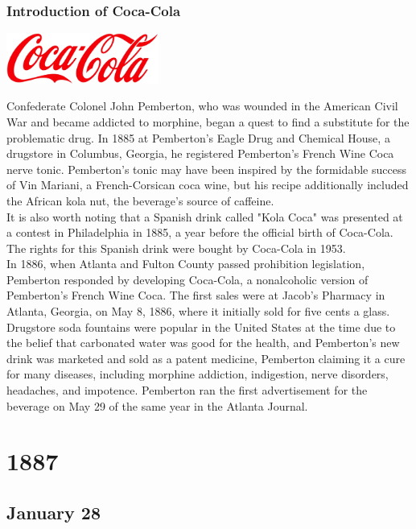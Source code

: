 \documentclass[11pt]{report}
\begin{document}
\subsection{Introduction of Coca-Cola}
\vspace{2mm}\begin{center}\includegraphics[width=5cm]{./img/cocacolaLogo.jpg}\end{center}
Confederate Colonel John Pemberton, who was wounded in the American Civil War and became addicted to morphine, began a quest to find a substitute for the problematic drug. In 1885 at Pemberton's Eagle Drug and Chemical House, a drugstore in Columbus, Georgia, he registered Pemberton's French Wine Coca nerve tonic. Pemberton's tonic may have been inspired by the formidable success of Vin Mariani, a French-Corsican coca wine, but his recipe additionally included the African kola nut, the beverage's source of caffeine.\\ \indent It is also worth noting that a Spanish drink called "Kola Coca" was presented at a contest in Philadelphia in 1885, a year before the official birth of Coca-Cola. The rights for this Spanish drink were bought by Coca-Cola in 1953.\\ \indent In 1886, when Atlanta and Fulton County passed prohibition legislation, Pemberton responded by developing Coca-Cola, a nonalcoholic version of Pemberton's French Wine Coca. The first sales were at Jacob's Pharmacy in Atlanta, Georgia, on May 8, 1886, where it initially sold for five cents a glass. Drugstore soda fountains were popular in the United States at the time due to the belief that carbonated water was good for the health, and Pemberton's new drink was marketed and sold as a patent medicine, Pemberton claiming it a cure for many diseases, including morphine addiction, indigestion, nerve disorders, headaches, and impotence. Pemberton ran the first advertisement for the beverage on May 29 of the same year in the Atlanta Journal.

\chapter{1887}
\section{January 28}
\end{document}
